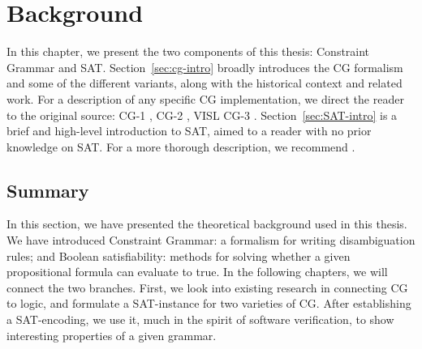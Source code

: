 \chapter{Background}

In this chapter, we present the two components of this thesis: Constraint Grammar and SAT.
Section~\ref{sec:cg-intro} broadly introduces the CG formalism and some of the different variants, along with the historical context and related work.
For a description of any specific CG implementation, we direct the reader to the original source: CG-1 \cite{karlsson1990cgp,karlsson1995constraint}, CG-2 \cite{tapanainen1996}, VISL CG-3 \cite{bick2015,vislcg3}.
Section~\ref{sec:SAT-intro} is a brief and high-level introduction to SAT, aimed to a reader with no prior knowledge on SAT. For a more thorough description, we recommend \cite{biere2009handbook}.






\section{Summary}

In this section, we have presented the theoretical background used in this thesis. 
We have introduced Constraint Grammar: a formalism for writing disambiguation rules; and Boolean satisfiability: methods for solving whether a given propositional formula can evaluate to true.
In the following chapters, we will connect the two branches. First, we look into existing research in connecting CG to logic, and formulate a SAT-instance for two varieties of CG. After establishing a SAT-encoding, we use it, much in the spirit of software verification, to show interesting properties of a given grammar. 



 






